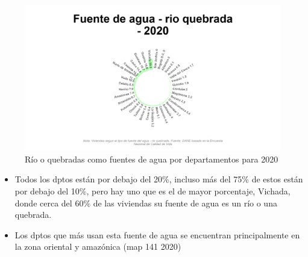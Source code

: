     \begin{figure}[H]
        \caption{Río o quebradas como fuentes de agua por departamentos para 2020 \label{map_result_2} }
        \begin{center}
        \includegraphics[width=\textwidth,keepaspectratio]{img/var_141_static.png}
        \end{center}
    \end{figure}
            \begin{itemize}
                    \item Todos los dptos están por debajo del 20\%, incluso más del 75\% de estos están por debajo del 10\%, pero hay uno que es el de mayor porcentaje, Vichada, donde cerca del 60\% de las viviendas su fuente de agua es un río o una quebrada.
                    \item Los dptos que más usan esta fuente de agua se encuentran principalmente en la zona oriental y amazónica (map 141 2020)
                    \end{itemize}

